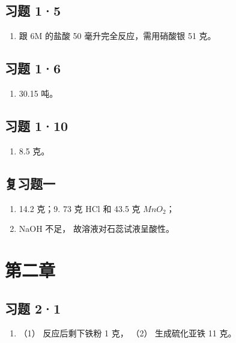\subsection{习题 1·5}

\begin{enumerate}[start=4]
\item
  跟 6M 的盐酸 50 毫升完全反应，需用硝酸银 51 克。
\end{enumerate}

\subsection{习题 1·6}

\begin{enumerate}[start=5]
\item
  30.15 吨。
\end{enumerate}

\subsection{习题 1·10}

\begin{enumerate}[start=6]
\item
  8.5 克。
\end{enumerate}

\subsection{复习题一}

\begin{enumerate}[start=8]
\item
  14.2 克；9. 73 克 HCl 和 43.5 克 \(MnO_{2}\)；
\item
  NaOH 不足， 故溶液对石蕊试液呈酸性。
\end{enumerate}

\section{第二章}

\subsection{习题 2·1}

\begin{enumerate}[start=5]
\item
  （1） 反应后剩下铁粉 1 克， （2） 生成硫化亚铁 11 克。
\end{enumerate}

